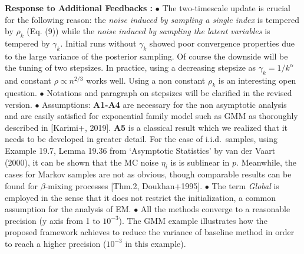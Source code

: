 \documentclass{article}
\begin{document}
\textbf{Response to Additional Feedbacks :}
$\bullet$ The two-timescale update is crucial for the following reason: the \emph{noise induced by sampling a single index} is tempered by $\rho_k$ (Eq. (9)) while the \emph{noise induced by sampling the latent variables} is tempered by $\gamma_k$. 
Initial runs without $\gamma_k$ showed poor convergence properties due to the large variance of the posterior sampling.
Of course the downside will be the tuning of two stepsizes. 
In practice, using a decreasing stepsize as $\gamma_k = 1/k^{\alpha}$ and constant $\rho \propto n^{2/3}$ works well.
Using a non constant $\rho_k$ is an interesting open question.
$\bullet$ Notations and paragraph on stepsizes will be clarified in the revised version.
$\bullet$ Assumptions: \textbf{A1-A4} are necessary for the non asymptotic analysis and are easily satisfied for exponential family model such as GMM as thoroughly described in [Karimi+, 2019].
\textbf{A5} is a classical result which we realized that it needs to be developed in greater detail. For the case of i.i.d.~samples, using Example 19.7, Lemma 19.36 from `Asymptotic Statistics' by van der Vaart (2000), it can be shown that the MC noise $\eta_i$ is is sublinear in $p$. Meanwhile, the cases for Markov samples are not as obvious, though comparable results can be found for $\beta$-mixing processes [Thm.2, Doukhan+1995]. 
$\bullet$ The term \emph{Global} is employed in the sense that it does not restrict the initialization, a common assumption for the analysis of EM.
$\bullet$ All the methods converge to a reasonable precision (y axis from 1 to $10^{-3}$).
The GMM example illustrates how the proposed framework achieves to reduce the variance of baseline method in order to reach a higher precision ($10^{-3}$ in this example).
\end{document}

